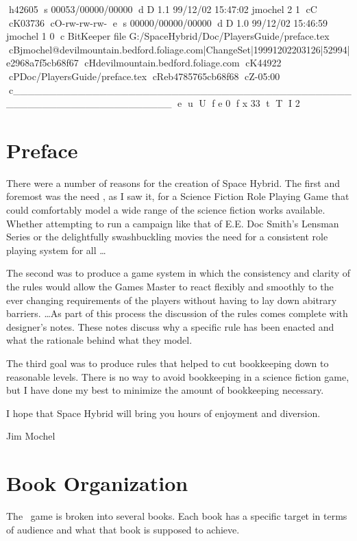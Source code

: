 h42605
s 00053/00000/00000
d D 1.1 99/12/02 15:47:02 jmochel 2 1
cC
cK03736
cO-rw-rw-rw-
e
s 00000/00000/00000
d D 1.0 99/12/02 15:46:59 jmochel 1 0
c BitKeeper file G:/SpaceHybrid/Doc/PlayersGuide/preface.tex
cBjmochel@devilmountain.bedford.foliage.com|ChangeSet|19991202203126|52994|e2968a7f5cb68f67
cHdevilmountain.bedford.foliage.com
cK44922
cPDoc/PlayersGuide/preface.tex
cReb4785765cb68f68
cZ-05:00
c______________________________________________________________________
e
u
U
f e 0
f x 33
t
T
I 2
\chapter*{Preface}

There were a number of reasons for the creation of Space Hybrid. The 
first and foremost was the need , as I saw it, for a Science 
Fiction Role Playing Game that could comfortably model a wide range
of the science fiction works available. Whether attempting to run 
a campaign like that of E.E. Doc Smith's Lensman Series or the 
delightfully swashbuckling  movies the need for a consistent
role playing system for all \dots

The second was to produce a game system in which the consistency 
and clarity of the rules would allow the Games Master to 
react flexibly and smoothly to the ever changing requirements
of the players without having to lay down abitrary barriers.
\dots As part of this process the discussion of the rules comes 
complete with designer's notes. These notes discuss why a 
specific rule has been enacted and what the rationale behind 
what they model. 

The third goal was to produce rules that helped to cut
bookkeeping down to reasonable levels. There is no way to avoid 
bookkeeping in a science fiction game, but I have done my best to
minimize the amount of bookkeeping necessary.

I hope that Space Hybrid will bring you hours of enjoyment and
diversion.

\begin{em}
	Jim Mochel
\end{em}

\chapter*{Book Organization}

The \SH\ game is broken into several books. Each book has
a specific target in terms of audience and what that book is supposed 
to achieve.

